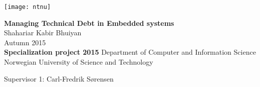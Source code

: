 
\thispagestyle{empty}
\texttt{[image: ntnu]}
\mbox{}\\[6pc]
\begin{center}
\Huge{\textbf{Managing Technical Debt in Embedded systems}}\\[4pc]
\Large{Shahariar Kabir Bhuiyan}\\[1pc]
\large{Autumn 2015}\\[2pc]

\textbf{Specialization project 2015}
\linebreak
Department of Computer and Information Science\\
Norwegian University of Science and Technology
\end{center}
\vfill

\noindent Supervisor 1: Carl-Fredrik Sørensen

